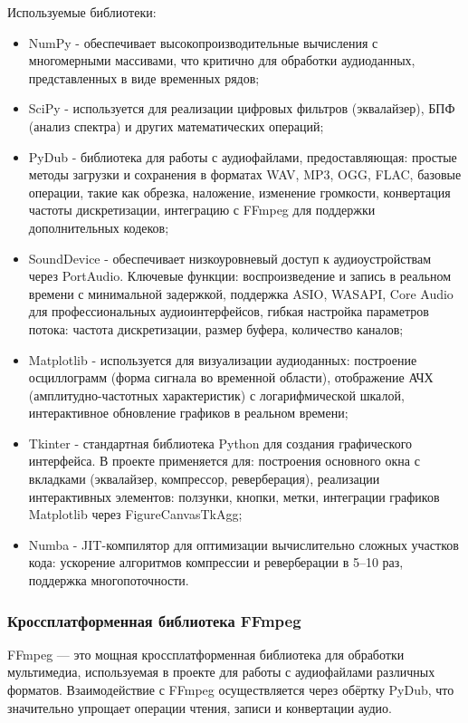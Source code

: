 Используемые библиотеки:
\begin{itemize}
	\item NumPy - обеспечивает высокопроизводительные вычисления с многомерными массивами, что критично для обработки аудиоданных, представленных в виде временных рядов;
	\item SciPy - используется для реализации цифровых фильтров (эквалайзер), БПФ (анализ спектра) и других математических операций;
	\item PyDub - библиотека для работы с аудиофайлами, предоставляющая: простые методы загрузки и сохранения в форматах WAV, MP3, OGG, FLAC, базовые операции, такие как обрезка, наложение, изменение громкости, конвертация частоты дискретизации, интеграцию с FFmpeg для поддержки дополнительных кодеков;
	\item SoundDevice - обеспечивает низкоуровневый доступ к аудиоустройствам через PortAudio. Ключевые функции: воспроизведение и запись в реальном времени с минимальной задержкой, поддержка ASIO, WASAPI, Core Audio для профессиональных аудиоинтерфейсов, гибкая настройка параметров потока: частота дискретизации, размер буфера, количество каналов;
	\item Matplotlib - используется для визуализации аудиоданных: построение осциллограмм (форма сигнала во временной области), отображение АЧХ (амплитудно-частотных характеристик) с логарифмической шкалой, интерактивное обновление графиков в реальном времени;
	\item Tkinter - стандартная библиотека Python для создания графического интерфейса. В проекте применяется для: построения основного окна с вкладками (эквалайзер, компрессор, реверберация), реализации интерактивных элементов: ползунки, кнопки, метки, интеграции графиков Matplotlib через FigureCanvasTkAgg;
	\item Numba - JIT-компилятор для оптимизации вычислительно сложных участков кода: ускорение алгоритмов компрессии и реверберации в 5–10 раз, поддержка многопоточности.
\end{itemize}

\subsubsection{Кроссплатформенная библиотека FFmpeg}

FFmpeg — это мощная кроссплатформенная библиотека для обработки мультимедиа, используемая в проекте для работы с аудиофайлами различных форматов. Взаимодействие с FFmpeg осуществляется через обёртку PyDub, что значительно упрощает операции чтения, записи и конвертации аудио.

